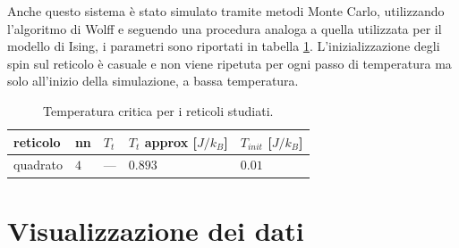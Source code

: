 \documentclass{article}
\begin{document}
Anche questo sistema è stato simulato tramite metodi Monte Carlo, utilizzando l'algoritmo di Wolff e seguendo una procedura analoga a quella utilizzata per il modello di Ising, i parametri sono riportati in tabella \ref{tab:ltXY}.
L'inizializzazione degli spin sul reticolo è casuale e non viene ripetuta per ogni passo di temperatura ma solo all'inizio della simulazione, a bassa temperatura.

\begin{table}[ht]
\begin{center}
\begin{tabular}{lllll}
\toprule
reticolo & nn & $T_t$ & $T_t$ approx [$J/k_B$] & $T_{init}$ [$J/k_B$]\\
\midrule
quadrato & $4$ & --- & $0.893$ & $0.01$\\
\bottomrule
\end{tabular}
\end{center}
\caption{Temperatura critica per i reticoli studiati.}
\label{tab:ltXY}
\end{table}

\section{Visualizzazione dei dati}
\end{document}
